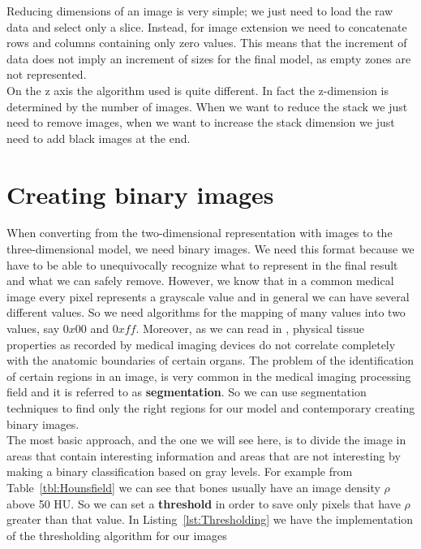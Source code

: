 Reducing dimensions of an image is very simple; we just need to load the raw data and select only a slice. Instead, for image extension we need to concatenate rows and columns containing only zero values. This means that the increment of data does not imply an increment of sizes for the final model, as empty zones are not represented.\\

On the z axis the algorithm used is quite different. In fact the z-dimension is determined by the number of images. When we want to reduce the stack we just need to remove images, when we want to increase the stack dimension we just need to add black images at the end.

\section{Creating binary images}\label{sec32:BinaryImages}

When converting from the two-dimensional representation with images to the three-dimensional model, we need binary images. We need this format because we have to be able to unequivocally recognize what to represent in the final result and what we can safely remove. However, we know that in a common medical image every pixel represents a grayscale value and in general we can have several different values. So we need algorithms for the mapping of many values into two values, say $0x00$ and $0xff$. 
Moreover, as we can read in \cite{Birkfellner}, physical tissue properties as recorded by medical imaging devices do not correlate completely with the anatomic boundaries of certain organs. The problem of the identification of certain regions in an image, is very common in the medical imaging processing field and it is referred to as \textbf{segmentation}. So we can use segmentation techniques to find only the right regions for our model and contemporary creating binary images.\\

The most basic approach, and the one we will see here, is to divide the image in areas that contain interesting information and areas that are not interesting by making a binary classification based on gray levels. For example from Table~\ref{tbl:Hounsfield} we can see that bones usually have an image density $\rho$ above 50 HU. So we can set a \textbf{threshold} in order to save only pixels that have $\rho$ greater than that value. In Listing~\ref{lst:Thresholding} we have the implementation of the thresholding algorithm for our images

